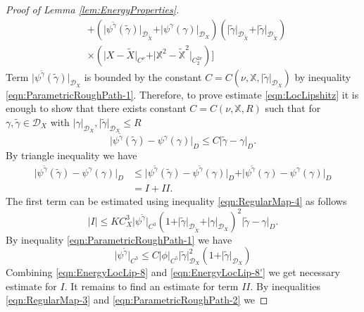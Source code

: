 \documentclass[11pt,a4paper,leqno]{amsart}%
\theoremstyle{plain}
\theoremstyle{remark}
\theoremstyle{plain}
\numberwithin{equation}{section}
\begin{document}
\begin{proof}[ Proof of Lemma \ref{lem:EnergyProperties}]
\begin{align*}
&+(\vert \psi^{\tilde{\gamma}}(\tilde{\gamma})\vert_{\mathcal{D}_{\tilde{X}}}+
\vert \psi^{\gamma}(\gamma)\vert_{\mathcal{D}_X})(\vert \tilde{\gamma}\vert_{\mathcal{D}_{\tilde{X}}}+\vert \tilde{\gamma}\vert_{\mathcal{D}_{\tilde{X}}})\\
&\times(\vert X-\tilde{X}\vert_{C^{\nu}}+\vert \mathbb{X}^2-\mathbb{\tilde{X}}^2\vert_{C_2^{2\nu}})\Big]
\end{align*}
Term $\vert \psi^{\tilde{\gamma}}(\tilde{\gamma})\vert_{\mathcal{D}_X}$ is
bounded by the constant
$C=C(\nu,\mathbb{X},\vert \tilde{\gamma}\vert_{\mathcal{D}_X})$ by
inequality \eqref{eqn:ParametricRoughPath-1}. Therefore, to prove
estimate \eqref{eqn:LocLipshitz} it is enough to show that there
exists constant $C=C(\nu,\mathbb{X},R)$ such that for
$\gamma,\tilde{\gamma}\in\mathcal{D}_X$ with
$\vert \gamma\vert_{\mathcal{D}_X},\vert \tilde{\gamma}\vert_{\mathcal{D}_X}\leq R$
\begin{equation}
\vert \psi^{\tilde{\gamma}}(\tilde{\gamma})-\psi^{\gamma}(\gamma)\vert_D\leq
C\vert \tilde{\gamma}-\gamma\vert_D.\label{eqn:EnergyLocLip-6}
\end{equation}
By triangle inequality we have
\begin{align}
\vert \psi^{\tilde{\gamma}}(\tilde{\gamma})-\psi^{\gamma}(\gamma)\vert_D
&\leq\vert \psi^{\tilde{\gamma}}(\tilde{\gamma})-\psi^{\tilde{\gamma}}(\gamma)\vert_D+
\vert \psi^{\tilde{\gamma}}(\gamma)-\psi^{\gamma}(\gamma)\vert_D\nonumber\\
&=I+II.\label{eqn:EnergyLocLip-7}
\end{align}
The first term can be estimated using inequality
\eqref{eqn:RegularMap-4} as follows
\begin{equation}
\vert I\vert \leq
KC_X^3\vert \psi^{\tilde{\gamma}}\vert_{C^3}(1+\vert \tilde{\gamma}\vert_{\mathcal{D}_{\tilde{X}}}+
\vert \gamma\vert_{\mathcal{D}_X})^2\vert \tilde{\gamma}-\gamma\vert_D.\label{eqn:EnergyLocLip-8}
\end{equation}
By inequality \eqref{eqn:ParametricRoughPath-1} we have
\begin{equation}
\vert \psi^{\tilde{\gamma}}\vert_{C^3}\leq
C\vert \phi\vert_{C^5}\vert \tilde{\gamma}\vert_{\mathcal{D}_X}^2(1+\vert \tilde{\gamma}\vert_{\mathcal{D}_X})\label{eqn:EnergyLocLip-8'}
\end{equation}
Combining \eqref{eqn:EnergyLocLip-8} and
\eqref{eqn:EnergyLocLip-8'} we get necessary estimate for $I$. It
remains to find an estimate for term $II$. By inequalities
\eqref{eqn:RegularMap-3} and \eqref{eqn:ParametricRoughPath-2} we

\end{proof}
\end{document}
